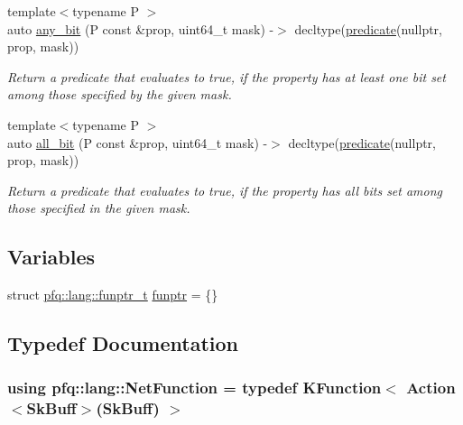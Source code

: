 \begin{DoxyCompactItemize}
\item 
{\footnotesize template$<$typename P $>$ }\\auto \hyperlink{namespacepfq_1_1lang_ac247c3827084d381d8518dabfff43bb2}{any\+\_\+bit} (P const \&prop, uint64\+\_\+t mask) -\/$>$ decltype(\hyperlink{namespacepfq_1_1lang_aca9adafc436b7f851621b979fa1aaf88}{predicate}(nullptr, prop, mask))
\begin{DoxyCompactList}\small\item\em Return a predicate that evaluates to {\ttfamily true}, if the property has at least one bit set among those specified by the given mask. \end{DoxyCompactList}\item 
{\footnotesize template$<$typename P $>$ }\\auto \hyperlink{namespacepfq_1_1lang_a62b1989f7b5d84549a99b1df46743bd6}{all\+\_\+bit} (P const \&prop, uint64\+\_\+t mask) -\/$>$ decltype(\hyperlink{namespacepfq_1_1lang_aca9adafc436b7f851621b979fa1aaf88}{predicate}(nullptr, prop, mask))
\begin{DoxyCompactList}\small\item\em Return a predicate that evaluates to {\ttfamily true}, if the property has all bits set among those specified in the given mask. \end{DoxyCompactList}\end{DoxyCompactItemize}
\subsection*{Variables}
\begin{DoxyCompactItemize}
\item 
struct \hyperlink{structpfq_1_1lang_1_1funptr__t}{pfq\+::lang\+::funptr\+\_\+t} \hyperlink{namespacepfq_1_1lang_a8d957b8f6df7198413d3ff9bd698e682}{funptr} = \{\}
\end{DoxyCompactItemize}


\subsection{Typedef Documentation}
\subsubsection[{\texorpdfstring{Net\+Function}{NetFunction}}]{\setlength{\rightskip}{0pt plus 5cm}using {\bf pfq\+::lang\+::\+Net\+Function} = typedef {\bf K\+Function}$<$ {\bf Action}$<${\bf Sk\+Buff}$>$({\bf Sk\+Buff}) $>$}\hypertarget{namespacepfq_1_1lang_a683f79c96532eb04a9750215004f6da3}{}\label{namespacepfq_1_1lang_a683f79c96532eb04a9750215004f6da3}
